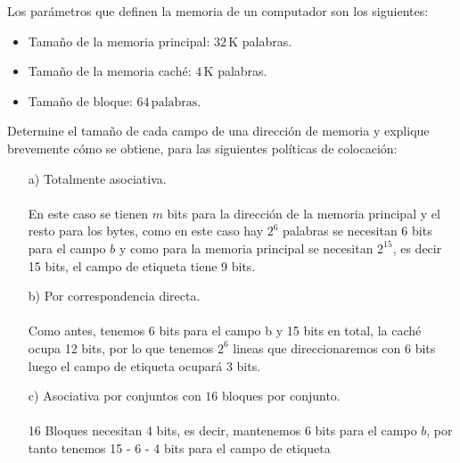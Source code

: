 \begin{ejercicio}
    Los parámetros que definen la memoria de un computador son los siguientes:
    \begin{itemize}
        \item Tamaño de la memoria principal: \(32 \, \text{K}\) palabras.
        \item Tamaño de la memoria caché: \(4 \, \text{K}\) palabras.
        \item Tamaño de bloque: \(64 \, \text{palabras}\).
    \end{itemize}
    Determine el tamaño de cada campo de una dirección de memoria y explique brevemente cómo se obtiene, para las siguientes políticas de colocación:
    \begin{itemize}
        \item[a)] Totalmente asociativa.
            \\ \\ En este caso se tienen $m$ bits para la dirección de la memoria principal y el resto para los bytes, como en este caso hay $2^6$ palabras se 
            necesitan 6 bits para el campo $b$ y como para la memoria principal se necesitan $2^{15}$, es decir 15 bits, el campo de etiqueta tiene 9 bits.
        \item[b)] Por correspondencia directa.
            \\ \\ Como antes, tenemos 6 bits para el campo b y 15 bits en total, la caché ocupa 12 bits, por lo que tenemos $2^6$ lineas que direccionaremos con 6 bits
            luego el campo de etiqueta ocupará 3 bits.
        \item[c)] Asociativa por conjuntos con \(16\) bloques por conjunto.
            \\ \\
            16 Bloques necesitan 4 bits, es decir, mantenemos 6 bits para el campo $b$, por tanto tenemos 15 - 6 - 4 bits para el campo de etiqueta
    \end{itemize}
\end{ejercicio}

